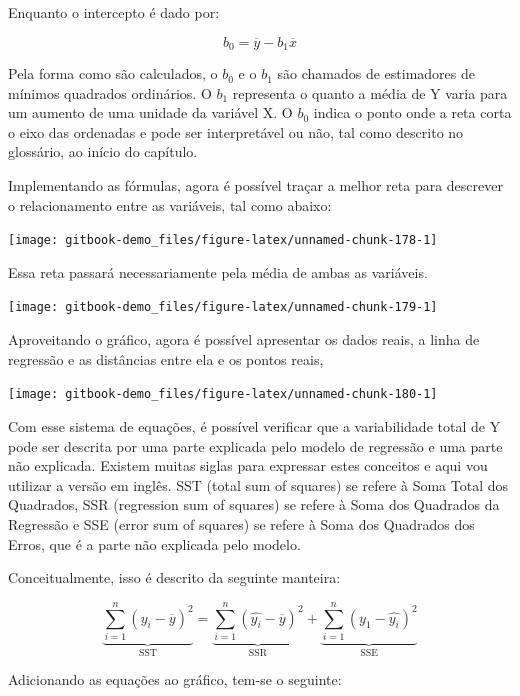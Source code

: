 \documentclass[
]{book}
\begin{document}
Enquanto o intercepto é dado por:

\[b_0 = \overline{y} - b_1 \overline{x}\]

Pela forma como são calculados, o \(b_0\) e o \(b_1\) são chamados de estimadores de mínimos quadrados ordinários. O \(b_1\) representa o quanto a média de Y varia para um aumento de uma unidade da variável X. O \(b_0\) indica o ponto onde a reta corta o eixo das ordenadas e pode ser
interpretável ou não, tal como descrito no glossário, ao início do capítulo.

Implementando as fórmulas, agora é possível traçar a melhor reta para descrever o relacionamento entre as variáveis, tal como abaixo:

\begin{center}\texttt{[image: gitbook-demo\_files/figure-latex/unnamed-chunk-178-1]} \end{center}

Essa reta passará necessariamente pela média de ambas as variáveis.

\begin{center}\texttt{[image: gitbook-demo\_files/figure-latex/unnamed-chunk-179-1]} \end{center}

Aproveitando o gráfico, agora é possível apresentar os dados reais, a linha de regressão e as distâncias entre ela e os pontos reais,

\begin{center}\texttt{[image: gitbook-demo\_files/figure-latex/unnamed-chunk-180-1]} \end{center}

Com esse sistema de equações, é possível verificar que a variabilidade total de Y pode ser descrita por uma parte explicada pelo modelo de regressão e uma parte não explicada. Existem muitas siglas para expressar estes conceitos e aqui vou utilizar a versão em inglês. SST (total sum of squares) se refere à Soma Total dos Quadrados, SSR (regression sum of squares) se refere à Soma dos Quadrados da Regressão e SSE (error sum of squares) se refere à Soma dos Quadrados dos Erros, que é a parte não explicada pelo modelo.

Conceitualmente, isso é descrito da seguinte manteira:

\[\underbrace{\sum\limits_{i=1}^{n} (y_i-\overline{y})^2}_\text{SST} = \underbrace{\sum\limits_{i=1}^{n} (\widehat{y_i}-\overline{y})^2}_\text{SSR} + \underbrace{\sum\limits_{i=1}^{n} (y_1-\widehat{y_i})^2}_\text{SSE}\]

Adicionando as equações ao gráfico, tem-se o seguinte:
\end{document}
